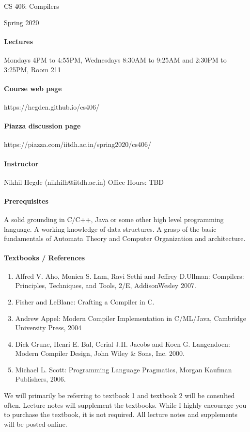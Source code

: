 \documentclass{article}
\begin{document}
\begin{center}{\LARGE CS 406: Compilers} \end{center}
\begin{center}{\large Spring 2020} \end{center}

\bigskip

\paragraph{Lectures}
Mondays 4PM to 4:55PM, Wednesdays 8:30AM to 9:25AM and 2:30PM to 3:25PM, Room 211
\paragraph{Course web page} https://hegden.github.io/cs406/
\paragraph{Piazza discussion page} https://piazza.com/iitdh.ac.in/spring2020/cs406/

\paragraph{Instructor}
Nikhil Hegde (nikhilh@iitdh.ac.in)
Office Hours: TBD

\paragraph{Prerequisites}  A solid grounding in C/C++, Java or some other high level programming language. 
A working knowledge of data structures. 
A grasp of the basic fundamentals of Automata Theory and Computer Organization and architecture. 

\paragraph{Textbooks / References} 
\begin{enumerate}
	\item Alfred V. Aho, Monica S. Lam, Ravi Sethi and Jeffrey D.Ullman: Compilers: Principles, Techniques, and Tools, 2/E, AddisonWesley 2007.
	\item Fisher and LeBlanc: Crafting a Compiler in C. 
	\item Andrew Appel: Modern Compiler Implementation in C/ML/Java, Cambridge University Press, 2004
	\item Dick Grune, Henri E. Bal, Cerial J.H. Jacobs and Koen G. Langendoen: Modern Compiler Design, John Wiley & Sons, Inc. 2000.
	\item Michael L. Scott: Programming Language Pragmatics, Morgan Kaufman Publishers, 2006.
\end{enumerate}
We will primarily be referring to textbook 1 and textbook 2 will be consulted often. Lecture notes will supplement the textbooks. 
While I highly encourage you to purchase the textbook, it is not required.
All lecture notes and supplements will be posted online.  
\end{document}
